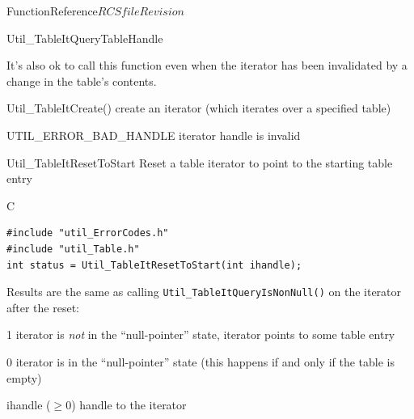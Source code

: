 \begin{cactuspart}{FunctionReference}{$RCSfile$}{$Revision$}
\begin{FunctionDescription}{Util\_TableItQueryTableHandle}
\begin{Discussion}
It's also ok to call this function even when the iterator has been
invalidated by a change in the table's contents.
\end{Discussion}

\begin{SeeAlsoSection}
\begin{SeeAlso}{Util\_TableItCreate()}
create an iterator (which iterates over a specified table)
\end{SeeAlso}
\end{SeeAlsoSection}

\begin{ErrorSection}
\begin{Error}{UTIL\_ERROR\_BAD\_HANDLE}
iterator handle is invalid
\end{Error}
\end{ErrorSection}
\end{FunctionDescription}


\begin{FunctionDescription}{Util\_TableItResetToStart}
\label{Util-TableItResetToStart}
Reset a table iterator to point to the starting table entry

\begin{SynopsisSection}
\begin{Synopsis}{C}
\begin{verbatim}
#include "util_ErrorCodes.h"
#include "util_Table.h"
int status = Util_TableItResetToStart(int ihandle);
\end{verbatim}
\end{Synopsis}
\end{SynopsisSection}

\begin{ResultSection}
\begin{ResultNote}
Results are the same as calling \verb|Util_TableItQueryIsNonNull()|
on the iterator after the reset:
\end{ResultNote}
\begin{Result}{\rm 1}
iterator is {\em not\/} in the ``null-pointer'' state,
\ie{} iterator points to some table entry
\end{Result}
\begin{Result}{\rm 0}
iterator is in the ``null-pointer'' state
(this happens if and only if the table is empty)
\end{Result}
\end{ResultSection}

\begin{ParameterSection}
\begin{Parameter}{ihandle ($\ge 0$)}
handle to the iterator
\end{Parameter}
\end{ParameterSection}


\end{FunctionDescription}
\end{cactuspart}
